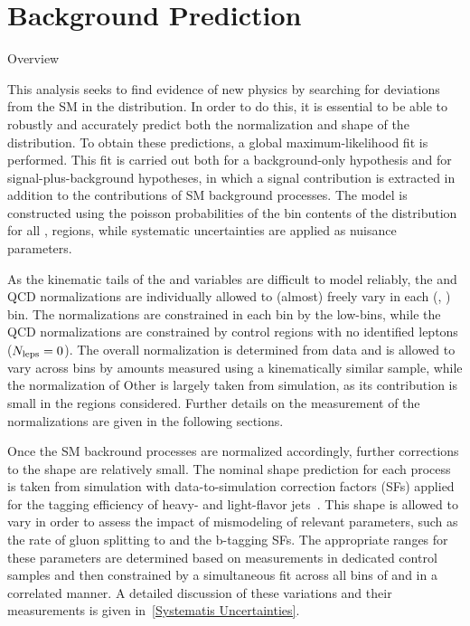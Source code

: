 \chapter{Background Prediction}
\begin{section}{Overview}

This analysis seeks to find evidence of new physics by searching for deviations from the SM in the \Nb distribution.
In order to do this, it is essential to be able to robustly and accurately predict both the normalization and shape of the \Nb distribution.
To obtain these predictions, a global maximum-likelihood fit is performed.
This fit is carried out both for a background-only hypothesis and for signal-plus-background hypotheses, in which a signal contribution is extracted in addition to the contributions of SM background processes.
The model is constructed using the poisson probabilities of the bin contents of the \Nb distribution for all \Njets, \MJ regions, while systematic uncertainties are applied as nuisance parameters.

As the kinematic tails of the \Njets and \MJ variables are difficult to model reliably, the \ttbar and QCD normalizations are individually allowed to (almost) freely vary in each (\Njets, \MJ) bin.
The \ttbar normalizations are constrained in each bin by the low-\Nb bins, while the QCD normalizations are constrained by control regions with no identified leptons ($N_{\mathrm{leps}} = 0$).
The overall \Wjets normalization is determined from data and is allowed to vary across \Njets bins by amounts measured using a kinematically similar \Zjets sample, while the normalization of Other is largely taken from simulation, as its contribution is small in the regions considered.
Further details on the measurement of the normalizations are given in the following sections.

Once the SM backround processes are normalized accordingly, further corrections to the \Nb shape are relatively small.
The nominal \Nb shape prediction for each process is taken from simulation with data-to-simulation correction factors (SFs) applied for the tagging efficiency of heavy- and light-flavor jets~\cite{Chatrchyan:2012jua,Sirunyan:2017ezt}.
This shape is allowed to vary in order to assess the impact of mismodeling of relevant parameters, such as the rate of gluon splitting to \bbbar and the b-tagging SFs.
The appropriate ranges for these parameters are determined based on measurements in dedicated control samples and then constrained by a simultaneous fit across all bins of \Njets and \MJ in a correlated manner.
A detailed discussion of these variations and their measurements is given in~\ref{Systematis Uncertainties}.

\end{section}


